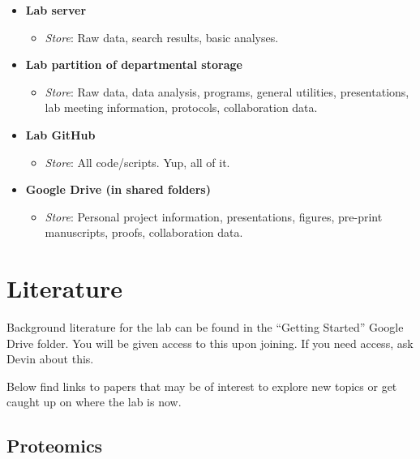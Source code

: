 \documentclass[
]{book}
\providecommand{\tightlist}{%
  \setlength{\itemsep}{0pt}\setlength{\parskip}{0pt}}
\begin{document}
\begin{itemize}
\tightlist
\item
  \textbf{Lab server}

  \begin{itemize}
  \tightlist
  \item
    \emph{Store}: Raw data, search results, basic analyses.
  \end{itemize}
\item
  \textbf{Lab partition of departmental storage}

  \begin{itemize}
  \tightlist
  \item
    \emph{Store}: Raw data, data analysis, programs, general utilities, presentations, lab meeting information, protocols, collaboration data.
  \end{itemize}
\item
  \textbf{Lab GitHub}

  \begin{itemize}
  \tightlist
  \item
    \emph{Store}: All code/scripts. Yup, all of it.
  \end{itemize}
\item
  \textbf{Google Drive (in shared folders)}

  \begin{itemize}
  \tightlist
  \item
    \emph{Store}: Personal project information, presentations, figures, pre-print manuscripts, proofs, collaboration data.
  \end{itemize}
\end{itemize}

\hypertarget{literature}{%
\chapter{Literature}\label{literature}}

Background literature for the lab can be found in the ``Getting Started'' Google Drive folder. You will be given access to this upon joining. If you need access, ask Devin about this.

Below find links to papers that may be of interest to explore new topics or get caught up on where the lab is now.

\hypertarget{proteomics}{%
\section{Proteomics}\label{proteomics}}
\end{document}
